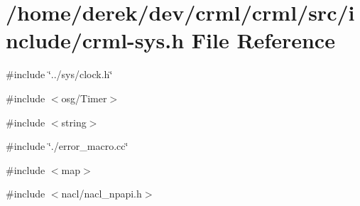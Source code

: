 \hypertarget{crml-sys_8h}{
\section{/home/derek/dev/crml/crml/src/include/crml-\/sys.h File Reference}
\label{crml-sys_8h}
}
{\ttfamily \#include \char`\"{}../sys/clock.h\char`\"{}}\par
{\ttfamily \#include $<$osg/Timer$>$}\par
{\ttfamily \#include $<$string$>$}\par
{\ttfamily \#include \char`\"{}./error\_\-macro.cc\char`\"{}}\par
{\ttfamily \#include $<$map$>$}\par
{\ttfamily \#include $<$nacl/nacl\_\-npapi.h$>$}\par
